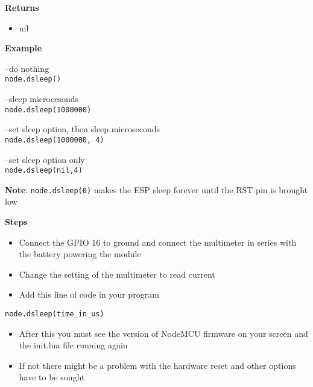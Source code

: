 \documentclass[16pt]{article}
\begin{document}
\textbf{Returns}

\begin{itemize}

\item
  nil
\end{itemize}

\textbf{Example}
\vspace{0.1cm}

--do nothing\\
\texttt{node.dsleep()}\\

\vspace{0.1cm}

--sleep microcesonds\\
\texttt{node.dsleep(1000000)}\\

\vspace{0.1cm}

--set sleep option, then sleep microseconds\\
\texttt{node.dsleep(1000000, 4)}\\

\vspace{0.1cm}

--set sleep option only\\
\texttt{node.dsleep(nil,4)}

\vspace{0.3cm}

\textbf{Note}: \texttt{node.dsleep(0)} makes the ESP sleep forever until
the RST pin is brought low


\vspace{0.5cm}
{\Large{\textbf{Steps}}}

\begin{itemize}

\item
  Connect the GPIO 16 to ground and connect the multimeter in series
  with the battery powering the module
\item
  Change the setting of the multimeter to read current
\item
  Add this line of code in your program
\end{itemize}

\texttt{node.dsleep(time\_in\_us)}

\begin{itemize}

\item
  After this you must see the version of NodeMCU firmware on your screen
  and the init.lua file running again
\item
  If not there might be a problem with the hardware reset and other
  options have to be sought
\end{itemize}
\end{document}
